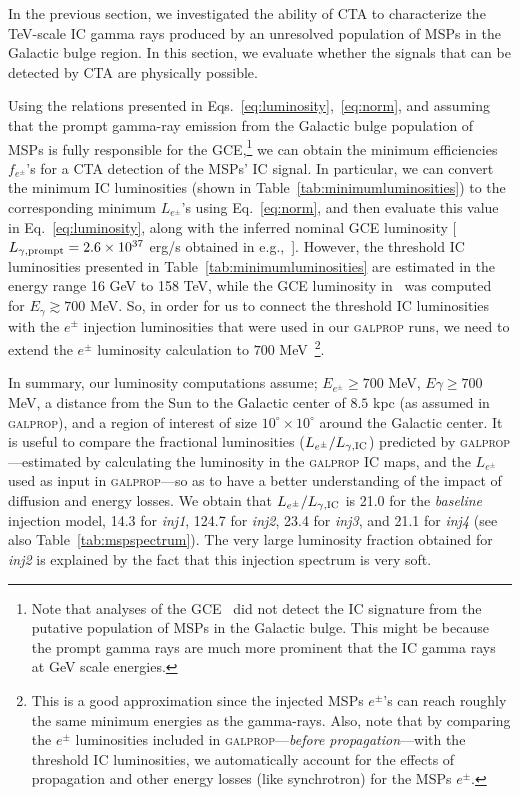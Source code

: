 \documentclass[doublespace,nopageskip]{VTthesis} %
\begin{document}
In the previous section, we  investigated the ability of CTA to characterize the TeV-scale IC gamma rays produced by an unresolved population of MSPs in the Galactic bulge region. In this section, we evaluate whether the signals that can be detected by CTA are physically possible.

 Using the relations presented in Eqs.~\ref{eq:luminosity},~\ref{eq:norm}, and assuming that the prompt gamma-ray emission from the Galactic bulge population of MSPs is fully responsible for the GCE,\footnote{Note that analyses of the  
 GCE~\citep{Lacroix:2015wfx} did not detect the IC signature from the putative population of MSPs in the Galactic bulge. This might be because the prompt gamma rays are much more prominent that the IC gamma rays at GeV scale energies.}  we can obtain the minimum efficiencies $f_{e^\pm}$'s for a CTA detection of the MSPs' IC signal. In particular, we can convert the minimum IC luminosities (shown in Table~\ref{tab:minimumluminosities}) to the corresponding minimum $L_{e^\pm}$'s using Eq.~\ref{eq:norm}, and then evaluate this value in  Eq.~\ref{eq:luminosity}, along with the inferred nominal GCE luminosity [$L_{\gamma, {\rm prompt}}=2.6\times 10^{37}$ erg/s obtained in e.g.,~\citet{Macias:2019omb}]. However, the threshold IC luminosities presented in Table~\ref{tab:minimumluminosities} are estimated in the energy range 16 GeV to 158 TeV, while the GCE luminosity in~\citet{Macias:2019omb} was computed for $E_{\gamma} \gtrsim 700$ MeV. So, in order for us to connect the threshold IC luminosities with the $e^\pm$ injection luminosities that were used in our \textsc{galprop} runs, we need to extend the $e^\pm$ luminosity calculation to $700$ MeV~\footnote{This is a good approximation since the injected MSPs $e^\pm$'s can reach roughly the same minimum energies as the gamma-rays. Also, note that by comparing the $e^\pm$ luminosities included in \textsc{galprop}---\textit{before propagation}---with the threshold IC luminosities, we automatically account for the effects of propagation and other energy losses (like synchrotron) for the MSPs $e^\pm$.}. 

In summary, our luminosity computations assume; $E_{e^\pm}\geq700$ MeV, $E{\gamma}\geq700$ MeV, a distance from the Sun to the Galactic center of $8.5$ kpc (as assumed in \textsc{galprop}), and a region of interest of size $10^\circ\times10^\circ$ around the Galactic center. It is useful to compare the fractional luminosities ($L_{e^\pm}/L_{\gamma, {\rm IC}}$) predicted by \textsc{galprop}---estimated by calculating the luminosity in the \textsc{galprop} IC maps, and the $L_{e^\pm}$ used as input in \textsc{galprop}---so as to have a better understanding of the impact of diffusion and energy losses. We obtain that $L_{e^\pm}/L_{\gamma, {\rm IC}}$ is 21.0 for the \textit{baseline} injection model, 14.3 for \textit{inj1}, 124.7 for \textit{inj2}, 23.4 for \textit{inj3}, and 21.1 for \textit{inj4} (see also Table~\ref{tab:mspspectrum}). The very large luminosity fraction obtained for \textit{inj2} is explained by the fact that this injection spectrum is very soft.       
\end{document}
